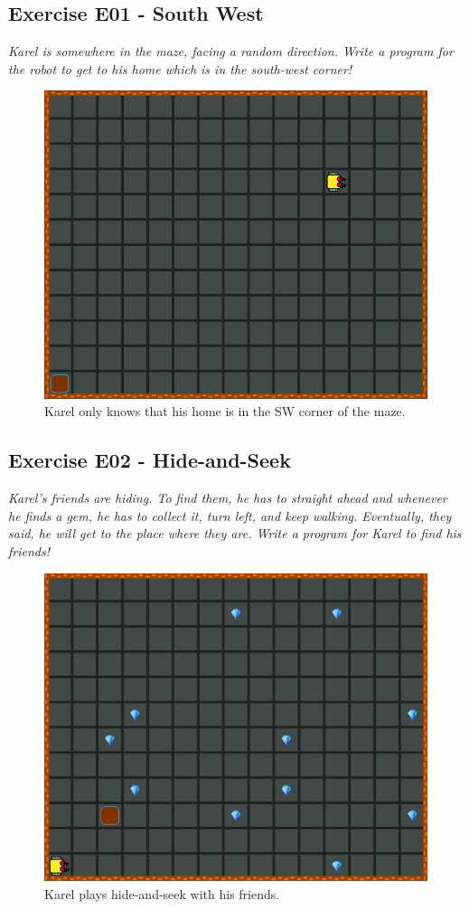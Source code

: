 {{{{\subsection{Exercise E01 - South West}

{\em Karel is somewhere in the maze, facing a random direction. Write a program for the robot to get 
to his home which is in the south-west corner!}\\[-7mm]

\begin{figure}[!ht]
\begin{center}
\includegraphics[height=0.4\textwidth]{imgk/e01.png}
\end{center}
\vspace{-4mm}
\caption{Karel only knows that his home is in the SW corner of the maze.}
\label{fig:e01}
\vspace{-8mm}
\end{figure}
\noindent

\subsection{Exercise E02 - Hide-and-Seek}

{\em Karel's friends are hiding. To find them, he has to straight ahead 
and whenever he finds a gem, he has to collect it, 
turn left, and keep walking. Eventually, they said, he will get to the place 
where they are. Write a program for Karel to find his friends!}\\[-7mm]


\begin{figure}[!ht]
\begin{center}
\includegraphics[height=0.4\textwidth]{imgk/e02.png}
\end{center}
\vspace{-4mm}
\caption{Karel plays hide-and-seek with his friends.}
\label{fig:e02}
\vspace{-10mm}
\end{figure}
\noindent
\newpage

}}}}
